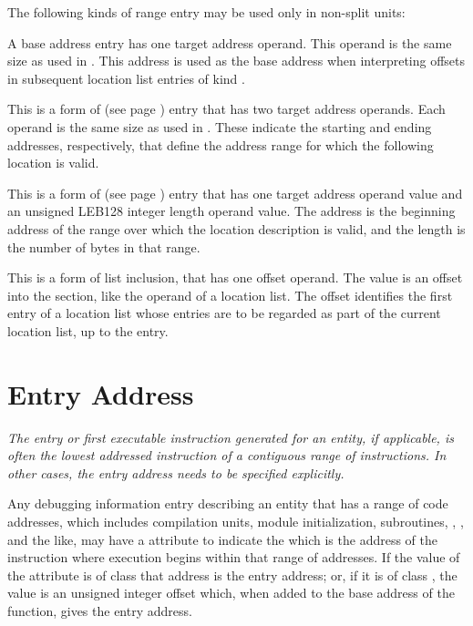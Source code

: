 The following kinds of range entry may be used only in non-split
units:

\begin{enumerate}[1. ]
\addtocounter{enumi}{5}
\itembfnl{\DWRLEbaseaddressTARG}
A base address entry has one target address operand.
This operand is the same size as used in \DWFORMaddr.
This address is used as the base address when interpreting
offsets in subsequent location list entries of kind
\DWRLEoffsetpair.

\itembfnl{\DWRLEstartendTARG}
This is a form of 
\bb
(see page \pageref{text:bndrng})
\eb
entry that has two target address operands. Each
operand is the same size as used in \DWFORMaddr.
These indicate the starting and ending addresses,
respectively, that define the address range for which
the following location is valid.

\itembfnl{\DWRLEstartlengthTARG}
This is a form of 
\bb
(see page \pageref{text:bndrng})
\eb
entry that has one target address operand value and an unsigned LEB128
integer length operand value. The address is the beginning address
of the range over which the location description is valid, and
the length is the number of bytes in that range.

\bb
\itembfnl{\DWRLEincludernglistTARG}
This is a form of list inclusion, that has one offset operand.  The
value is an offset into the \dotdebugrnglists{} section, like the
operand of a \DWFORMsecoffset{} location list.  The offset identifies the
first entry of a location list whose entries are to be regarded as part of
the current location list, up to the \DWRLEendoflist{} entry.
\eb

\end{enumerate}

\section{Entry Address}
\label{chap:entryaddress}
\textit{The entry or first executable instruction generated
for an entity, if applicable, is often the lowest addressed
instruction of a contiguous range of instructions. In other
cases, the entry address needs to be specified explicitly.}

Any debugging information entry describing an entity that has
a range of code addresses, which includes compilation units,
module initialization, subroutines,
,
,
and the like, may have a \DWATentrypcDEFN{} attribute
 to indicate the
 which is the address of the
instruction where execution begins
within that range\hypertarget{chap:entryaddressofscope}{}
of addresses.
If the value of the \DWATentrypcNAME{} attribute is of
class \CLASSaddress{} that address is the entry address;
or, if it is of class
\CLASSconstant, the value is an unsigned integer offset which,
when added to the base address of the function, gives the entry
address.


